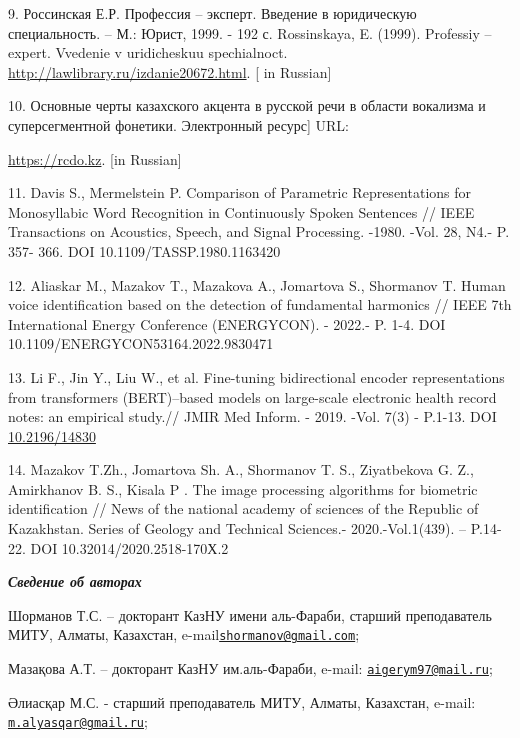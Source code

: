 9. Россинская Е.Р. Профессия -- эксперт. Введение в юридическую
специальность. -- М.: Юрист, 1999. - 192 с. Rossinskaya, E. (1999).
Professiy -- expert. Vvedenie v uridicheskuu spechialnoct.
\url{http://lawlibrary.ru/izdanie20672.html}. {[} in Russian{]}

10. Основные черты казахского акцента в русской речи в области вокализма
и суперсегментной фонетики. Электронный ресурс{]} URL:

\href{https://rcdo.kz/publ/9555-osnovnye-cherty-kazahskogo-akcenta-v-russkoy-rechi-v-oblasti-vokalizma-i-supersegmentnoy-fonetiki.html}{https://rcdo.kz}.
{[}in Russian{]}

11. Davis S., Mermelstein P. Comparison of Parametric Representations
for Monosyllabic Word Recognition in Continuously Spoken Sentences //
IEEE Transactions on Acoustics, Speech, and Signal Processing. -1980.
-Vol. 28, N4.- P. 357- 366. DOI 10.1109/TASSP.1980.1163420

12. Aliaskar M., Mazakov T., Mazakova A., Jomartova S., Shormanov T.
Human voice identification based on the detection of fundamental
harmonics // IEEE 7th International Energy Conference (ENERGYCON). -
2022.- P. 1-4. DOI 10.1109/ENERGYCON53164.2022.9830471

13. Li F., Jin Y., Liu W., et al. Fine-tuning bidirectional encoder
representations from transformers (BERT)--based models on large-scale
electronic health record notes: an empirical study.// JMIR Med Inform. -
2019. -Vol. 7(3) - P.1-13. DOI
\href{https://doi.org/10.2196/14830}{10.2196/14830}

14. Mazakov T.Zh., Jomartova Sh. A., Shormanov T. S., Ziyatbekova G. Z.,
Amirkhanov B. S., Kisala P . The image processing algorithms for
biometric identification // News of the national academy of sciences of
the Republic of Kazakhstan. Series of Geology and Technical Sciences.-
2020.-Vol.1(439). -- P.14-22. DOI 10.32014/2020.2518-170Х.2

\emph{{\bfseries Сведение об авторах}}

Шорманов Т.С. -- докторант КазНУ имени аль-Фараби, старший преподаватель
МИТУ, Алматы, Казахстан,
e-mail\href{mailto:shormanov@gmail.com}{\nolinkurl{shormanov@gmail.com}};

Мазақова А.Т. -- докторант КазНУ им.аль-Фараби, e-mail:
\href{mailto:aigerym97@mail.ru}{\nolinkurl{aigerym97@mail.ru}};

Әлиасқар М.С. - старший преподаватель МИТУ, Алматы, Казахстан, e-mail:
\href{mailto:m.alyasqar@gmail.ru}{\nolinkurl{m.alyasqar@gmail.ru}};

